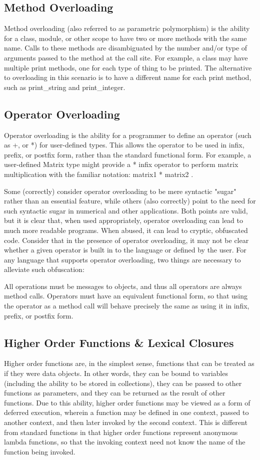\documentclass[12pt,a4paper,final,twoside,titlepage]{book}
\begin{document}
\subsection{Method Overloading}
Method overloading (also referred to as parametric polymorphism) is the ability for a class, module, or other scope to have two or more methods with the same name. Calls to these methods are disambiguated by the number and/or type of arguments passed to the method at the call site. For example, a class may have multiple print methods, one for each type of thing to be printed. The alternative to overloading in this scenario is to have a different name for each print method, such as print\_string and print\_integer.

\subsection{Operator Overloading}
Operator overloading is the ability for a programmer to define an operator (such as +, or *) for user-defined types. This allows the operator to be used in infix, prefix, or postfix form, rather than the standard functional form. For example, a user-defined Matrix type might provide a * infix operator to perform matrix multiplication with the familiar notation: matrix1 * matrix2 .

Some (correctly) consider operator overloading to be mere syntactic "sugar" rather than an essential feature, while others (also correctly) point to the need for such syntactic sugar in numerical and other applications. Both points are valid, but it is clear that, when used appropriately, operator overloading can lead to much more readable programs. When abused, it can lead to cryptic, obfuscated code. Consider that in the presence of operator overloading, it may not be clear whether a given operator is built in to the language or defined by the user. For any language that supports operator overloading, two things are necessary to alleviate such obfuscation:

All operations must be messages to objects, and thus all operators are always method calls.
Operators must have an equivalent functional form, so that using the operator as a method call will behave precisely the same as using it in infix, prefix, or postfix form.

\subsection{Higher Order Functions \& Lexical Closures}
Higher order functions are, in the simplest sense, functions that can be treated as if they were data objects. In other words, they can be bound to variables (including the ability to be stored in collections), they can be passed to other functions as parameters, and they can be returned as the result of other functions. Due to this ability, higher order functions may be viewed as a form of deferred execution, wherein a function may be defined in one context, passed to another context, and then later invoked by the second context. This is different from standard functions in that higher order functions represent anonymous lambda functions, so that the invoking context need not know the name of the function being invoked.
\end{document}
